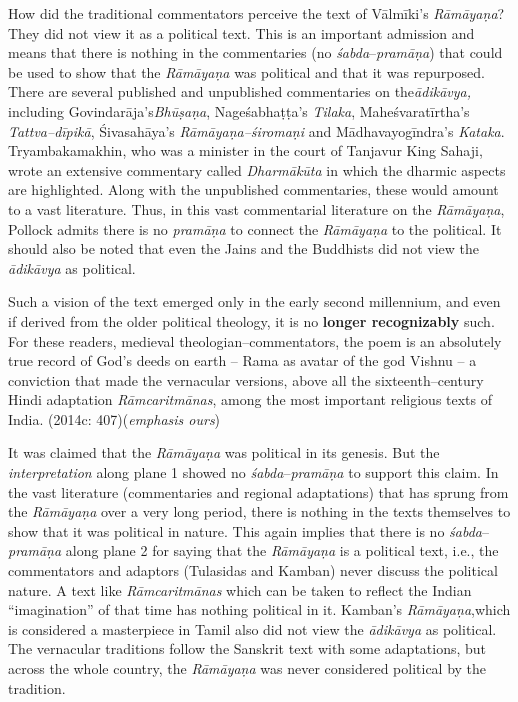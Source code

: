 How did the traditional commentators perceive the text of Vālmīki’s \textit{Rāmāyaṇa}? They did not view it as a political text. This is an important admission and means that there is nothing in the commentaries (no\textit{ śabda}–\textit{pramāṇa}) that could be used to show that the \textit{Rāmāyaṇa }was political and that it was repurposed. There are several published and unpublished commentaries on the\textit{ādikāvya,} including Govindarāja’s\textit{Bhūṣaṇa}, Nageśabhaṭṭa’s \textit{Tilaka}, Maheśvaratīrtha’s \textit{Tattva–dīpikā}, Śivasahāya’s \textit{Rāmāyaṇa–śiromaṇi} and Mādhavayogīndra’s \textit{Kataka}. Tryambakamakhin, who was a minister in the court of Tanjavur King Sahaji, wrote an extensive commentary called \textit{Dharmākūta }in which the dharmic aspects are highlighted. Along with the unpublished commentaries, these would amount to a vast literature. Thus, in this vast commentarial literature on the \textit{Rāmāyaṇa}, Pollock admits there is no \textit{pramāṇa} to connect the \textit{Rāmāyaṇa }to the political. It should also be noted that even the Jains and the Buddhists did not view the\textit{ ādikāvya} as political.

\begin{myquote}
Such a vision of the text emerged only in the early second millennium, and even if derived from the older political theology, it is no \textbf{longer recognizably} such. For these readers, medieval theologian–commentators, the poem is an absolutely true record of God’s deeds on earth – Rama as avatar of the god Vishnu – a conviction that made the vernacular versions, above all the sixteenth–century Hindi adaptation \textit{Rāmcaritmānas}, among the most important religious texts of India. (2014c: 407)(\textit{emphasis ours})
\end{myquote}

It was claimed that the \textit{Rāmāyaṇa }was political in its genesis. But the \textit{interpretation} along plane 1 showed no \textit{śabda}–\textit{pramāṇa }to support this claim. In the vast literature (commentaries and regional adaptations) that has sprung from the \textit{Rāmāyaṇa }over a very long period, there is nothing in the texts themselves to show that it was political in nature. This again implies that there is no \textit{śabda}–\textit{pramāṇa} along plane 2 for saying that the \textit{Rāmāyaṇa }is a political text, i.e., the commentators and adaptors (Tulasidas and Kamban) never discuss the political nature. A text like \textit{Rāmcaritmānas} which can be taken to reflect the Indian “imagination” of that time has nothing political in it. Kamban’s\textit{ Rāmāyaṇa},which is considered a masterpiece in Tamil also did not view the \textit{ādikāvya }as political. The vernacular traditions follow the Sanskrit text with some adaptations, but across the whole country, the \textit{Rāmāyaṇa} was never considered political by the tradition.


